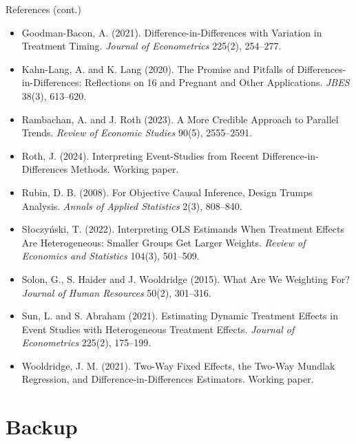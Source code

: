 \documentclass[
  11pt,
  ignorenonframetext,
  aspectratio=169,
]{beamer}
\providecommand{\tightlist}{%
  \setlength{\itemsep}{0pt}\setlength{\parskip}{0pt}}
\begin{document}
\begin{frame}{References (cont.)}
\protect{}\label{references-cont.}
\tiny

\begin{itemize}
\tightlist
\item
  Goodman-Bacon, A. (2021). Difference-in-Differences with Variation in
  Treatment Timing. \emph{Journal of Econometrics} 225(2), 254--277.
\item
  Kahn-Lang, A. and K. Lang (2020). The Promise and Pitfalls of
  Differences-in-Differences: Reflections on 16 and Pregnant and Other
  Applications. \emph{JBES} 38(3), 613--620.
\item
  Rambachan, A. and J. Roth (2023). A More Credible Approach to Parallel
  Trends. \emph{Review of Economic Studies} 90(5), 2555--2591.
\item
  Roth, J. (2024). Interpreting Event-Studies from Recent
  Difference-in-Differences Methods. Working paper.
\item
  Rubin, D. B. (2008). For Objective Causal Inference, Design Trumps
  Analysis. \emph{Annals of Applied Statistics} 2(3), 808--840.
\item
  Słoczyński, T. (2022). Interpreting OLS Estimands When Treatment
  Effects Are Heterogeneous: Smaller Groups Get Larger Weights.
  \emph{Review of Economics and Statistics} 104(3), 501--509.
\item
  Solon, G., S. Haider and J. Wooldridge (2015). What Are We Weighting
  For? \emph{Journal of Human Resources} 50(2), 301--316.
\item
  Sun, L. and S. Abraham (2021). Estimating Dynamic Treatment Effects in
  Event Studies with Heterogeneous Treatment Effects. \emph{Journal of
  Econometrics} 225(2), 175--199.
\item
  Wooldridge, J. M. (2021). Two-Way Fixed Effects, the Two-Way Mundlak
  Regression, and Difference-in-Differences Estimators. Working paper.
\end{itemize}
\end{frame}

\section{Backup}\label{backup}
\end{document}
